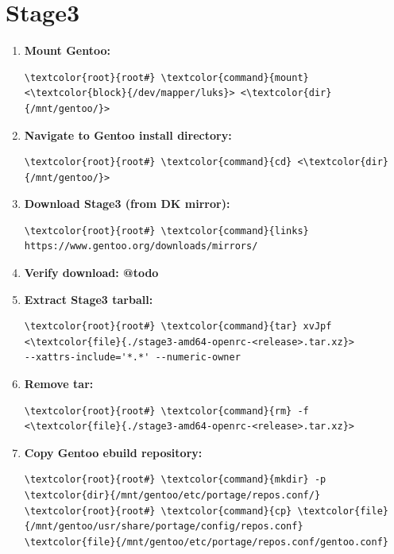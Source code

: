 \documentclass[10pt, a4paper, onecolumn, oneside, titlepage, openany]{book}
\begin{document}
\section{Stage3}
\begin{enumerate}
    \item \textbf{Mount Gentoo:}
\begin{Verbatim}[commandchars=\\\{\}]
\textcolor{root}{root#} \textcolor{command}{mount} <\textcolor{block}{/dev/mapper/luks}> <\textcolor{dir}{/mnt/gentoo/}>
\end{Verbatim}
    \item \textbf{Navigate to Gentoo install directory:}
\begin{Verbatim}[commandchars=\\\{\}]
\textcolor{root}{root#} \textcolor{command}{cd} <\textcolor{dir}{/mnt/gentoo/}>
\end{Verbatim}
    \item \textbf{Download Stage3 (from DK mirror):}
\begin{Verbatim}[commandchars=\\\{\}]
\textcolor{root}{root#} \textcolor{command}{links} https://www.gentoo.org/downloads/mirrors/
\end{Verbatim}
    \item \textbf{Verify download: @todo}
    \item \textbf{Extract Stage3 tarball:}
\begin{Verbatim}[commandchars=\\\{\}]
\textcolor{root}{root#} \textcolor{command}{tar} xvJpf <\textcolor{file}{./stage3-amd64-openrc-<release>.tar.xz}>
--xattrs-include='*.*' --numeric-owner
\end{Verbatim}
    \item \textbf{Remove tar:}
\begin{Verbatim}[commandchars=\\\{\}]
\textcolor{root}{root#} \textcolor{command}{rm} -f <\textcolor{file}{./stage3-amd64-openrc-<release>.tar.xz}>
\end{Verbatim}
    \item \textbf{Copy Gentoo ebuild repository:}
\begin{Verbatim}[commandchars=\\\{\}]
\textcolor{root}{root#} \textcolor{command}{mkdir} -p \textcolor{dir}{/mnt/gentoo/etc/portage/repos.conf/}
\textcolor{root}{root#} \textcolor{command}{cp} \textcolor{file}{/mnt/gentoo/usr/share/portage/config/repos.conf}
\textcolor{file}{/mnt/gentoo/etc/portage/repos.conf/gentoo.conf}
\end{Verbatim}
\end{enumerate}
\end{document}
